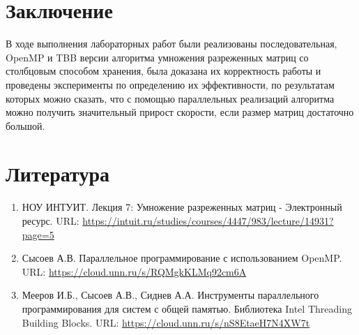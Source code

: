 \documentclass{report}
\begin{document}
\newpage

\section*{Заключение}
\par В ходе выполнения лабораторных работ были реализованы последовательная, OpenMP и TBB версии алгоритма умножения разреженных матриц со столбцовым способом хранения, была доказана их корректность работы и проведены эксперименты по определению их эффективности, по результатам которых можно сказать, что с помощью параллельных реализаций алгоритма можно получить значительный прирост скорости, если размер матриц достаточно большой.

\newpage

\section*{Литература}
\begin{enumerate}
    \item НОУ ИНТУИТ. Лекция 7: Умножение разреженных матриц - Электронный ресурс. URL: \newline
    \url{https://intuit.ru/studies/courses/4447/983/lecture/14931?page=5}
    \item Сысоев А.В. Параллельное программирование с использованием OpenMP. URL: \newline
    \url{https://cloud.unn.ru/s/RQMgkKLMq92cm6A}
    \item Мееров И.Б., Сысоев А.В., Сиднев А.А. Инструменты параллельного программирования для систем с общей памятью. Библиотека Intel Threading Building Blocks. URL: \newline
    \url{https://cloud.unn.ru/s/nS8EtaeH7N4XW7t}
\end{enumerate}
\newpage

\end{document}

